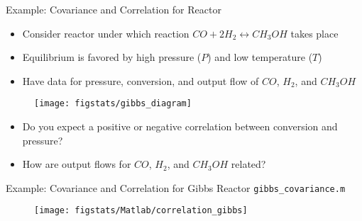 \documentclass[9pt]{beamer}
\begin{document}
%
\begin{frame}{Example: Covariance and Correlation for Reactor}

\begin{itemize}
\setlength{\itemsep}{5pt}
\item Consider reactor under which reaction $CO+2H_2\leftrightarrow CH_3OH$ takes place
\item Equilibrium is favored by high pressure ($P$) and low temperature ($T$)
\item Have data for pressure, conversion, and output flow of $CO$, $H_2$, and $CH_3OH$
\end{itemize}

\begin{figure}[!htb]
    \centering
	\texttt{[image: figstats/gibbs\_diagram]}
\end{figure}

\begin{block}{}
\begin{itemize}
\item Do you expect a positive or negative correlation between conversion and pressure?
 \item How are output flows for $CO$, $H_2$, and $CH_3OH$ related?
\end{itemize}
\end{block}

\end{frame}


%
\begin{frame}{Example: Covariance and Correlation for Gibbs Reactor \footnotesize{\texttt{gibbs\_covariance.m}}}


\begin{figure}[!htb]
    \centering
	\texttt{[image: figstats/Matlab/correlation\_gibbs]}
\end{figure}



\end{frame}
\end{document}
